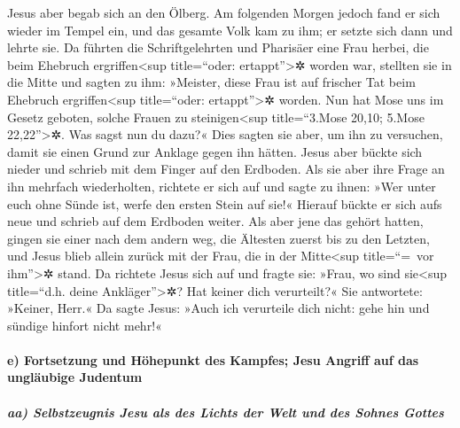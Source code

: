  Jesus aber begab sich an den Ölberg.  Am
folgenden Morgen jedoch fand er sich wieder im Tempel ein, und das
gesamte Volk kam zu ihm; er setzte sich dann und lehrte sie.
 Da führten die Schriftgelehrten und Pharisäer eine Frau
herbei, die beim Ehebruch ergriffen\textless sup title=``oder:
ertappt''\textgreater✲ worden war, stellten sie in die Mitte
 und sagten zu ihm: »Meister, diese Frau ist auf frischer
Tat beim Ehebruch ergriffen\textless sup title=``oder:
ertappt''\textgreater✲ worden.  Nun hat Mose uns im Gesetz
geboten, solche Frauen zu steinigen\textless sup title=``3.Mose 20,10;
5.Mose 22,22''\textgreater✲. Was sagst nun du dazu?«  Dies
sagten sie aber, um ihn zu versuchen, damit sie einen Grund zur Anklage
gegen ihn hätten. Jesus aber bückte sich nieder und schrieb mit dem
Finger auf den Erdboden.  Als sie aber ihre Frage an ihn
mehrfach wiederholten, richtete er sich auf und sagte zu ihnen: »Wer
unter euch ohne Sünde ist, werfe den ersten Stein auf sie!«
 Hierauf bückte er sich aufs neue und schrieb auf dem
Erdboden weiter.  Als aber jene das gehört hatten, gingen
sie einer nach dem andern weg, die Ältesten zuerst bis zu den Letzten,
und Jesus blieb allein zurück mit der Frau, die in der
Mitte\textless sup title=``=~vor ihm''\textgreater✲ stand.
 Da richtete Jesus sich auf und fragte sie: »Frau, wo
sind sie\textless sup title=``d.h. deine Ankläger''\textgreater✲? Hat
keiner dich verurteilt?« Sie antwortete: »Keiner, Herr.« 
Da sagte Jesus: »Auch ich verurteile dich nicht: gehe hin und sündige
hinfort nicht mehr!«

\hypertarget{e-fortsetzung-und-huxf6hepunkt-des-kampfes-jesu-angriff-auf-das-ungluxe4ubige-judentum}{%
\paragraph{e) Fortsetzung und Höhepunkt des Kampfes; Jesu Angriff auf
das ungläubige
Judentum}\label{e-fortsetzung-und-huxf6hepunkt-des-kampfes-jesu-angriff-auf-das-ungluxe4ubige-judentum}}

\hypertarget{aa-selbstzeugnis-jesu-als-des-lichts-der-welt-und-des-sohnes-gottes}{%
\subparagraph{aa) Selbstzeugnis Jesu als des Lichts der Welt und des
Sohnes
Gottes}\label{aa-selbstzeugnis-jesu-als-des-lichts-der-welt-und-des-sohnes-gottes}}

